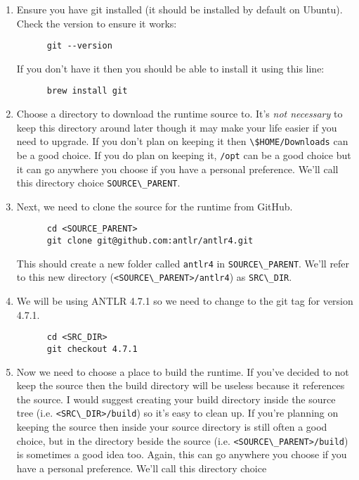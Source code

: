 \documentclass{article}
\begin{document}
\begin{enumerate}
  \item
    Ensure you have git installed (it should be installed by default on Ubuntu). Check the version
    to ensure it works:
    \begin{lstlisting}
      git --version
    \end{lstlisting}
    If you don't have it then you should be able to install it using this line:
    \begin{lstlisting}
      brew install git
    \end{lstlisting}
  \item
    Choose a directory to download the runtime source to. It's \emph{not necessary} to keep this
    directory around later though it may make your life easier if you need to upgrade. If you don't
    plan on keeping it then \lstinline{\$HOME/Downloads} can be a good choice. If you do plan on
    keeping it, \lstinline{/opt} can be a good choice but it can go anywhere you choose if you have
    a personal preference. We'll call this directory choice \lstinline{SOURCE\_PARENT}.
  \item
    Next, we need to clone the source for the runtime from GitHub.
    \begin{lstlisting}
      cd <SOURCE_PARENT>
      git clone git@github.com:antlr/antlr4.git
    \end{lstlisting}
    This should create a new folder called \lstinline{antlr4} in \lstinline{SOURCE\_PARENT}. We'll
    refer to this new directory (\lstinline{<SOURCE\_PARENT>/antlr4}) as \lstinline{SRC\_DIR}.
  \item
    We will be using ANTLR 4.7.1 so we need to change to the git tag for version 4.7.1.
    \begin{lstlisting}
      cd <SRC_DIR>
      git checkout 4.7.1
    \end{lstlisting}
  \item
    Now we need to choose a place to build the runtime. If you've decided to not keep the source
    then the build directory will be useless because it references the source. I would suggest
    creating your build directory inside the source tree (i.e. \lstinline{<SRC\_DIR>/build}) so
    it's easy to clean up. If you're planning on keeping the source then inside your source
    directory is still often a good choice, but in the directory beside the source (i.e.
    \lstinline{<SOURCE\_PARENT>/build}) is sometimes a good idea too. Again, this can go anywhere
    you choose if you have a personal preference. We'll call this directory choice

\end{enumerate}
\end{document}

